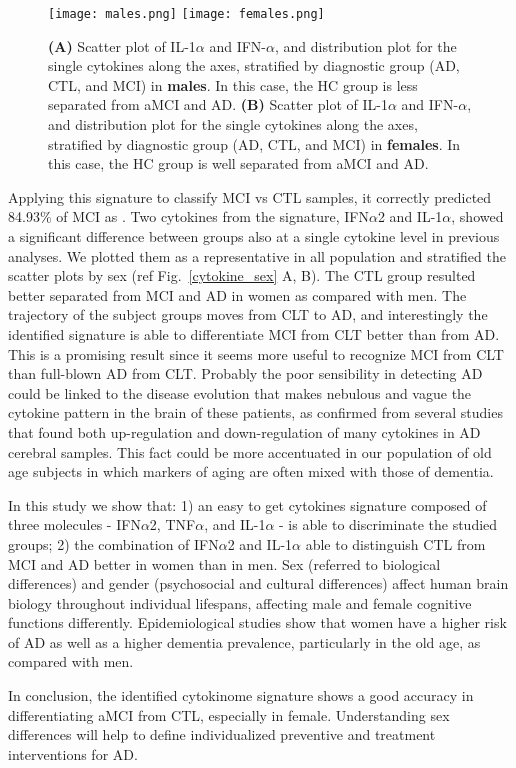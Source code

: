 \documentclass{standalone}
\begin{document}
\begin{figure}[htbp]
\centering
\texttt{[image: males.png]}
\qquad\qquad
\centering
\texttt{[image: females.png]}
\caption{\textbf{(A)} Scatter plot of IL-1$\alpha$ and IFN-$\alpha$, and distribution plot for the single cytokines along the axes, stratified by diagnostic group (AD, CTL, and MCI) in \textbf{males}.
In this case, the HC group is less separated from aMCI and AD.
\textbf{(B)} Scatter plot of IL-1$\alpha$ and IFN-$\alpha$, and distribution plot for the single cytokines along the axes, stratified by diagnostic group (AD, CTL, and MCI) in \textbf{females}.
In this case, the HC group is well separated from aMCI and AD.
}
\label{fig:cytokine_sex}
\end{figure}

Applying this signature to classify MCI vs CTL samples, it correctly predicted 84.93\% of MCI as .
Two cytokines from the signature, IFN$\alpha$2 and IL-1$\alpha$, showed a significant difference between groups also at a single cytokine level in previous analyses.
We plotted them as a representative in all population and stratified the scatter plots by sex (ref Fig.~\ref{cytokine_sex} A, B).
The CTL group resulted better separated from MCI and AD in women as compared with men.
The trajectory of the subject groups moves from CLT to AD, and interestingly the identified signature is able to differentiate MCI from CLT better than from AD.
This is a promising result since it seems more useful to recognize MCI from CLT than full-blown AD from CLT.
Probably the poor sensibility in detecting AD could be linked to the disease evolution that makes nebulous and vague the cytokine pattern in the brain of these patients, as confirmed from several studies that found both up-regulation and down-regulation of many cytokines in AD cerebral samples.
This fact could be more accentuated in our population of old age subjects in which markers of aging are often mixed with those of dementia.

In this study we show that: 1) an easy to get cytokines signature composed of three molecules - IFN$\alpha$2, TNF$\alpha$, and IL-1$\alpha$ - is able to discriminate the studied groups;  2) the combination of IFN$\alpha$2 and IL-1$\alpha$ able to distinguish CTL from  MCI and AD better in women than in men.
Sex (referred to biological differences) and gender (psychosocial and cultural differences) affect human brain biology throughout individual lifespans, affecting male and female cognitive functions differently.
Epidemiological studies show that women have a higher risk of AD as well as a higher dementia prevalence, particularly in the old age, as compared with men.

In conclusion, the identified cytokinome signature shows a good accuracy in differentiating aMCI from CTL, especially in female.
Understanding sex differences will help to define individualized preventive and treatment interventions for AD.
\end{document}
